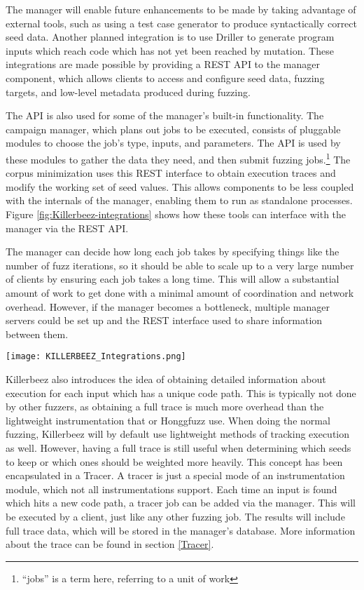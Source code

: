 The manager will enable future enhancements to be made by taking advantage of
external tools, such as
using a test case generator to produce syntactically correct seed data. Another planned integration
is to use Driller\cite{driller} to generate program inputs which reach
code which has not yet been reached by mutation. These integrations are made
possible by providing a REST API to the manager component, which allows clients
to access and configure seed data, fuzzing targets, and low-level metadata
produced during fuzzing.

The API is also used for some of the manager's built-in functionality. The
campaign manager, which plans out jobs to be
executed, consists of pluggable modules to choose the job's type, inputs, and
parameters. The API is used by these modules to gather the data they need,
and then submit fuzzing jobs.\footnote{``jobs'' is a \BOINC{} term here, referring to a unit of work} The corpus
minimization uses this REST interface to obtain
execution traces and modify the working set of seed values. This allows components to be
less coupled with the internals of the manager, enabling them to run as
standalone processes. Figure
\ref{fig:Killerbeez-integrations} shows how these tools can interface with the
manager via the REST API.

The manager can decide how long each job takes by specifying things like the
number of fuzz iterations, so it should be able to scale up to a very large number
of clients by ensuring each job takes a long time.  This will allow a substantial amount of
work to get done with a minimal amount of coordination and network overhead.
However, if the manager becomes a bottleneck, multiple
manager servers could be set up and the REST interface used to share
information between them.

\begin{figure*}[htb]
\centering
\texttt{[image: KILLERBEEZ\_Integrations.png]}
\caption{Killerbeez Integration with External Tools}
\label{fig:Killerbeez-integrations}
\end{figure*}


Killerbeez also introduces the idea of obtaining detailed information about
execution for each input which has a unique code path.  This is typically
not done by other fuzzers, as obtaining a full trace is much more overhead than
the lightweight instrumentation that \AFL{} or Honggfuzz use. When doing the
normal fuzzing, Killerbeez will by default use lightweight methods of tracking
execution as well. However, having a full trace is still useful when determining which
seeds to keep or which ones should be weighted more heavily. This concept has
been encapsulated in a Tracer. A tracer is just a special mode of an
instrumentation module, which not all instrumentations support. Each time an input
is found which hits a new code path, a tracer job can be added via the manager.
This will be executed by a \BOINC{} client, just like any other fuzzing job.
The results will include full trace data, which will be stored in the manager's
database.  More information about the trace can be found in section
\ref{Tracer}.

